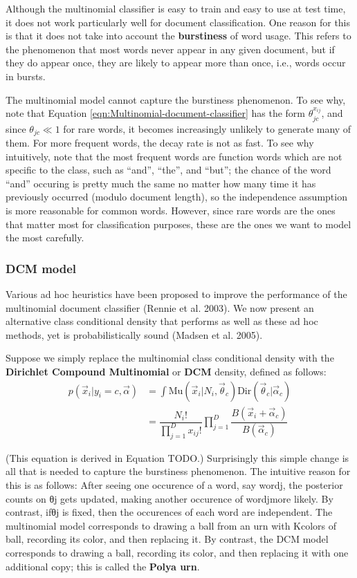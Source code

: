 {Although the multinomial classifier is easy to train and easy to use at test time, it does not work particularly well for document classification. One reason for this is that it does not take into account the \textbf{burstiness} of word usage. This refers to the phenomenon that most words never appear in any given document, but if they do appear once, they are likely to appear more than once, i.e., words occur in bursts.

The multinomial model cannot capture the burstiness phenomenon. To see why, note that Equation \ref{eqn:Multinomial-document-classifier} has the form $\theta_{jc}^{x_{ij}}$, and since $\theta_{jc} \ll 1$ for rare words, it becomes increasingly unlikely to generate many of them. For more frequent words, the decay rate is not as fast. To see why intuitively, note that the most frequent words are function words which are not specific to the class, such as “and”, “the”, and “but”; the chance of the word “and” occuring is pretty much the same no matter how many time it has previously occurred (modulo document length), so the independence assumption is more reasonable for common words. However, since rare words are the ones that matter most for classification purposes, these are the ones we want to model the most carefully.

\subsubsection{DCM model}
Various ad hoc heuristics have been proposed to improve the performance of the multinomial document classifier (Rennie et al. 2003). We now present an alternative class conditional density that performs as well as these ad hoc methods, yet is probabilistically sound (Madsen et al. 2005).

Suppose we simply replace the multinomial class conditional density with the \textbf{Dirichlet Compound Multinomial} or \textbf{DCM} density, defined as follows:
\begin{equation}\begin{split}
p(\vec{x}_i|y_i=c,\vec{\alpha}) & =\int \text{Mu}(\vec{x}_i|N_i,\vec{\theta}_c)\text{Dir}(\vec{\theta}_c|\vec{\alpha}_c) \\
   & =\dfrac{N_i!}{\prod_{j=1}^D x_{ij}!}\prod\limits_{j=1}^D\dfrac{B(\vec{x}_i+\vec{\alpha}_c)}{B(\vec{\alpha}_c)}
\end{split}\end{equation}

(This equation is derived in Equation TODO.) Surprisingly this simple change is all that is needed to capture the burstiness phenomenon. The intuitive reason for this is as follows: After seeing one occurence of a word, say wordj, the posterior counts on θj gets updated, making another occurence of wordjmore likely. By contrast, ifθj is fixed, then the occurences of each word are independent. The multinomial model corresponds to drawing a ball from an urn with Kcolors of ball, recording its color, and then replacing it. By contrast, the DCM model corresponds to drawing a ball, recording its color, and then replacing it with one additional copy; this is called the \textbf{Polya urn}.

}
